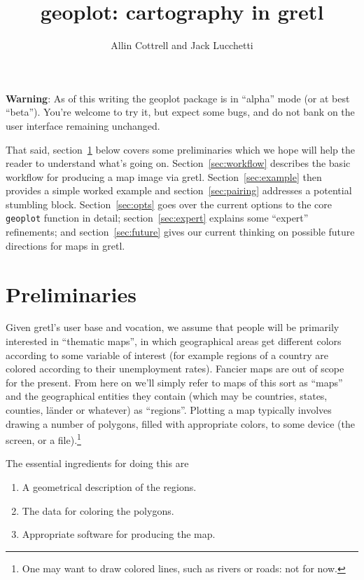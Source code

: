 \documentclass{article}
\title{geoplot: cartography in gretl}
\author{Allin Cottrell and Jack Lucchetti}
\begin{document}
\maketitle

\textbf{Warning}: As of this writing the \textsf{geoplot} package is
in ``alpha'' mode (or at best ``beta''). You're welcome to try it, but
expect some bugs, and do not bank on the user interface remaining
unchanged.

That said, section~\ref{sec:prelim} below covers some preliminaries
which we hope will help the reader to understand what's going
on. Section~\ref{sec:workflow} describes the basic workflow for
producing a map image via gretl. Section~\ref{sec:example} then
provides a simple worked example and section~\ref{sec:pairing}
addresses a potential stumbling block. Section~\ref{sec:opts} goes
over the current options to the core \texttt{geoplot} function in
detail; section~\ref{sec:expert} explains some ``expert'' refinements;
and section~\ref{sec:future} gives our current thinking on possible
future directions for maps in gretl.

\section{Preliminaries}
\label{sec:prelim}

Given gretl's user base and vocation, we assume that people will be
primarily interested in ``thematic maps'', in which geographical areas
get different colors according to some variable of interest (for
example regions of a country are colored according to their
unemployment rates). Fancier maps are out of scope for the
present. From here on we'll simply refer to maps of this sort as
``maps'' and the geographical entities they contain (which may be
countries, states, counties, l\"ander or whatever) as
``regions''. Plotting a map typically involves drawing a number of
polygons, filled with appropriate colors, to some device (the screen,
or a file).\footnote{One may want to draw colored lines, such as
  rivers or roads: not for now.}

The essential ingredients for doing this are
\begin{enumerate}
   \item A geometrical description of the regions.
   \item The data for coloring the polygons.
   \item Appropriate software for producing the map.
\end{enumerate}
\end{document}
